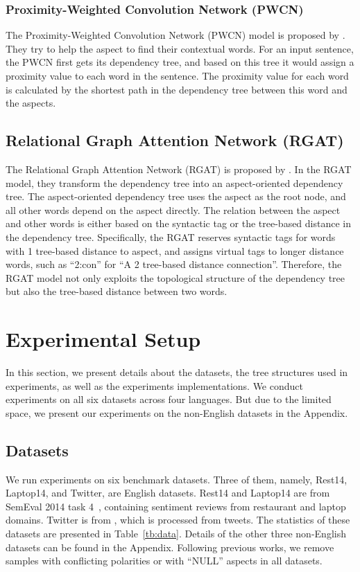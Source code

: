 \documentclass[11pt]{article}
\begin{document}
\subsubsection{Proximity-Weighted Convolution Network (PWCN)}
The Proximity-Weighted Convolution Network (PWCN) model is proposed by \citet{DBLP:conf/sigir/ZhangL019}. They try to help the aspect to find their contextual words. For an input sentence, the PWCN first gets its dependency  tree, and based on this tree it would assign a proximity value to each word in the sentence. The proximity value for each word is calculated by the shortest path in the dependency tree between this word and the aspects.
\subsection{Relational Graph Attention Network (RGAT)}
The Relational Graph Attention Network (RGAT) is proposed by \citet{DBLP:conf/acl/WangSYQW20}. In the RGAT model, they transform the dependency tree into an aspect-oriented dependency tree. The aspect-oriented dependency tree uses the aspect as the root node, and all other  words  depend on the aspect directly. The relation between the aspect and other words is either based on the syntactic tag or the tree-based distance in the dependency tree. Specifically, the RGAT reserves syntactic tags for words with 1 tree-based distance to aspect, and assigns virtual tags to longer distance words, such as ``2:con'' for ``A 2 tree-based distance connection''. Therefore, the RGAT model not only exploits the topological structure of the dependency tree but also the tree-based distance between two words.


\section{Experimental Setup}
\label{sec:exp}
In this section, we present details about the datasets, the tree structures used in experiments, as well as the experiments implementations. We conduct experiments  on all six datasets across four languages. But due to the limited space, we present our experiments on the non-English datasets in the Appendix.


\subsection{Datasets}
\label{sec:data}
We run experiments on six benchmark datasets. Three of them, namely, Rest14, Laptop14, and Twitter, are English datasets. Rest14 and Laptop14 are from SemEval 2014 task 4~\citep{DBLP:conf/semeval/PontikiGPPAM14}, containing sentiment reviews from restaurant and laptop domains. Twitter is from \citet{DBLP:conf/acl/DongWTTZX14}, which is processed from tweets.  The statistics of these datasets are presented in Table~\ref{tb:data}. Details of the other three non-English datasets can be found in the Appendix. Following previous works, we remove samples with conflicting polarities or with ``NULL'' aspects in all datasets.
\end{document}
